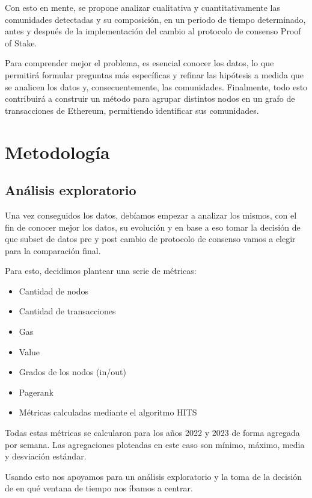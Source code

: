 \documentclass{article}
\begin{document}
Con esto en mente, se propone analizar cualitativa y cuantitativamente las comunidades detectadas y su composición, en un periodo de tiempo determinado, antes y después de la implementación del cambio al protocolo de consenso Proof of Stake.

Para comprender mejor el problema, es esencial conocer los datos, lo que permitirá formular preguntas más específicas y refinar las hipótesis a medida que se analicen los datos y, consecuentemente, las comunidades.
Finalmente, todo esto contribuirá a construir un método para agrupar distintos nodos en un grafo de transacciones de Ethereum, permitiendo identificar sus comunidades.


\section{Metodología}

\subsection{Análisis exploratorio}

Una vez conseguidos los datos, debíamos empezar a analizar los mismos, con el fin de conocer mejor los datos, su evolución y en base a eso tomar la decisión de que subset de datos pre y post cambio de protocolo de consenso vamos a elegir para la comparación final.

Para esto, decidimos plantear una serie de métricas:
\begin{itemize}
    \item Cantidad de nodos
    \item Cantidad de transacciones 
    \item Gas
    \item Value
    \item Grados de los nodos (in/out)
    \item Pagerank
    \item Métricas calculadas mediante el algoritmo HITS
\end{itemize}
Todas estas métricas se calcularon para los años 2022 y 2023 de forma agregada por semana. Las agregaciones ploteadas en este caso son mínimo, máximo, media y desviación estándar.

Usando esto nos apoyamos para un análisis exploratorio y la toma de la decisión de en qué ventana de tiempo nos íbamos a centrar.
\newpage
\end{document}
